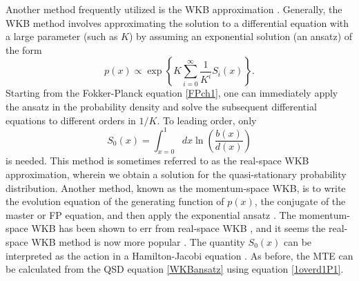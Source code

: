 Another method frequently utilized is the WKB approximation \cite{Doering2005,Assaf2006,Kessler2007,Kamenev2008,Assaf2010,Ovaskainen2010,Gottesman2012,Assaf2016,Yu2017}. 
Generally, the WKB method involves approximating the solution to a differential equation with a large parameter (such as $K$) by assuming an exponential solution (an ansatz) of the form \cite{Assaf2016}
\begin{equation}
p(x) \propto \exp \left\{ K \sum_{i=0}^\infty \frac{1}{K^i}S_i(x) \right\}.
 \label{WKBansatz}
\end{equation}
Starting from the Fokker-Planck equation \ref{FPch1}, one can immediately apply the ansatz in the probability density and solve the subsequent differential equations to different orders in $1/K$\cite{Assaf2016}. %
To leading order, only 
\begin{equation}
S_0(x) = \int_{x=0}^{1} dx \ln\left(\frac{b(x)}{d(x)}\right)
 \label{WKBaction}
\end{equation}
is needed. 
This method is sometimes referred to as the real-space WKB approximation, wherein we obtain a solution for the quasi-stationary probability distribution.
Another method, known as the momentum-space WKB, is to write the evolution equation of the generating function of $p(x)$, the conjugate of the master or FP equation, and then apply the exponential ansatz \cite{Assaf2006,Assaf2016}. 
The momentum-space WKB has been shown to err from real-space WKB \cite{Ovaskainen2010,Assaf2016}, and it seems the real-space WKB method is now more popular \cite{Kessler2007,Kamenev2008,Assaf2010,Ovaskainen2010,Gottesman2012,Assaf2016,Yu2017}. 
The quantity $S_0(x)$ can be interpreted as the action in a Hamilton-Jacobi equation \cite{Assaf2016}. 
As before, the MTE can be calculated from the QSD equation \ref{WKBansatz} using equation \ref{1overd1P1}. 

